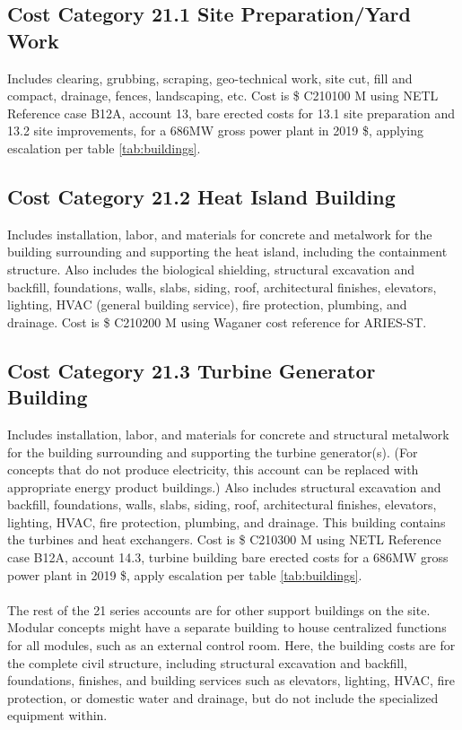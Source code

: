 










\subsection*{Cost Category 21.1 Site Preparation/Yard Work}
Includes clearing, grubbing, scraping, geo-technical work, site cut, fill and compact, drainage, fences, landscaping, etc.  Cost is \$ C210100 M using NETL Reference case B12A, account 13, bare erected costs for 13.1 site preparation and 13.2 site improvements, for a 686MW gross power plant in 2019 \$, applying escalation per table \ref{tab:buildings}.

\subsection*{Cost Category 21.2 Heat Island Building}
Includes installation, labor, and materials for concrete and metalwork for the building surrounding and supporting the heat island, including the containment structure. Also includes the biological shielding, structural excavation and backfill, foundations, walls, slabs, siding, roof, architectural finishes, elevators, lighting, HVAC (general building service), fire protection, plumbing, and drainage. Cost is \$ C210200 M using Waganer cost reference for ARIES-ST.


\subsection*{Cost Category 21.3 Turbine Generator Building}
Includes installation, labor, and materials for concrete and structural metalwork for the building surrounding and supporting the turbine generator(s). (For concepts that do not produce electricity, this account can be replaced with appropriate energy product buildings.) Also includes structural excavation and backfill, foundations, walls, slabs, siding, roof, architectural finishes, elevators, lighting, HVAC, fire protection, plumbing, and drainage.  This building contains the turbines and heat exchangers. Cost is \$ C210300 M using NETL Reference case B12A, account 14.3, turbine building bare erected costs for a 686MW gross power plant in 2019 \$, apply escalation per table \ref{tab:buildings}.

\paragraph{}
The rest of the 21 series accounts are for other support buildings on the site. Modular concepts might have a separate building to house centralized functions for all modules, such as an external control room. Here, the building costs are for the complete civil structure, including structural excavation and backfill, foundations, finishes, and building services such as elevators, lighting, HVAC, fire protection, or domestic water and drainage, but do not include the specialized equipment within.

